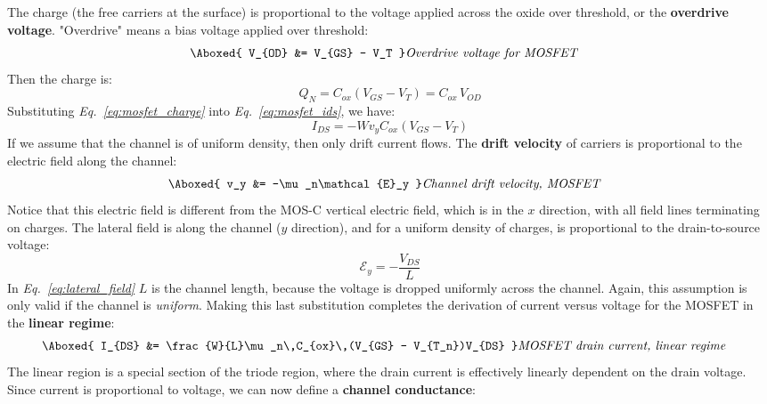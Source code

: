 The charge (the free carriers at the surface) is proportional to the voltage applied across the oxide over threshold, or the \textbf{overdrive voltage}.  "Overdrive" means a bias voltage applied over threshold:
    \begin{align}
        \Aboxed{ V_{OD} &= V_{GS} - V_T } &\textit{Overdrive voltage for MOSFET}
    \end{align}
Then the charge is:
    \begin{equation}
        Q_N = C_{ox}(V_{GS} - V_{T}) = C_{ox}\,V_{OD}
        \label{eq:mosfet_charge}
    \end{equation}
Substituting \emph{Eq.~\ref{eq:mosfet_charge}} into \emph{Eq.~\ref{eq:mosfet_ids}}, we have:
    \begin{equation}
        {I_{DS}} =  - W{v_y}{C_{ox}}({V_{GS}} - {V_{T}})
    \end{equation}
If we assume that the channel is of uniform density, then only drift current flows.  The \textbf{drift velocity} of carriers is proportional to the electric field along the channel:
    \begin{align}
        \Aboxed{ v_y &= -\mu_n\mathcal{E}_y } &\textit{Channel drift velocity, MOSFET}
    \end{align}
Notice that this electric field is different from the MOS-C vertical electric field, which is in the $x$ direction, with all field lines terminating on charges.  The lateral field is along the channel ($y$ direction), and for a uniform density of charges, is proportional to the drain-to-source voltage:
    \begin{equation}
        \mathcal{E}_y = -\frac{V_{DS}}{L}
        \label{eq:lateral_field}
    \end{equation}\textbf{}
In \emph{Eq.~\ref{eq:lateral_field}} $L$ is the channel length, because the voltage is dropped uniformly across the channel.  Again, this assumption is only valid if the channel is \textit{uniform}.  Making this last substitution completes the derivation of current versus voltage for the MOSFET in the \textbf{linear regime}:
    \begin{align}
        \Aboxed{ I_{DS} &= \frac{W}{L}\mu_n\,C_{ox}\,(V_{GS} - V_{T_n})V_{DS} } &\textit{MOSFET drain current, linear regime}
    \end{align}
The linear region is a special section of the triode region, where the drain current is effectively linearly dependent on the drain voltage. Since current is proportional to voltage, we can now define a \textbf{channel conductance}:
